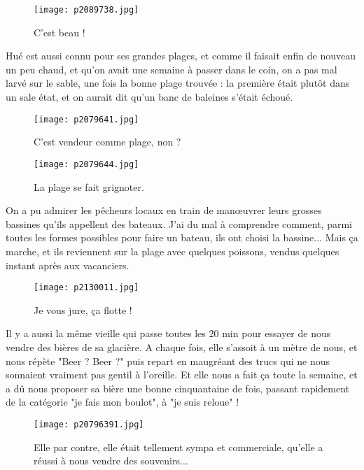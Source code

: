 \documentclass{book}
\begin{document}
\begin{figure}[h]
\centering
\texttt{[image: p2089738.jpg]}
\caption*{C'est beau !}
\end{figure}

Hué est aussi connu pour ses grandes plages, et comme il faisait enfin de nouveau un peu chaud, et qu'on avait une semaine à passer dans le coin, on a pas mal larvé sur le sable, une fois la bonne plage trouvée : la première était plutôt dans un sale état, et on aurait dit qu'un banc de baleines s'était échoué.




\begin{figure}[h]
\centering
\texttt{[image: p2079641.jpg]}
\caption*{C'est vendeur comme plage, non ?}
\end{figure}


\begin{figure}[h]
\centering
\texttt{[image: p2079644.jpg]}
\caption*{La plage se fait grignoter.}
\end{figure}

On a pu admirer les pêcheurs locaux en train de manœuvrer leurs grosses bassines qu'ils appellent des bateaux. J'ai du mal à comprendre comment, parmi toutes les formes possibles pour faire un bateau, ils ont choisi la bassine... Mais ça marche, et ils reviennent sur la plage avec quelques poissons, vendus quelques instant après aux vacanciers.




\begin{figure}[h]
\centering
\texttt{[image: p2130011.jpg]}
\caption*{Je vous jure, ça flotte !}
\end{figure}

Il y a aussi la même vieille qui passe toutes les 20 min pour essayer de nous vendre des bières de sa glacière. A chaque fois, elle s'assoit à un mètre de nous, et nous répète "Beer ? Beer ?" puis repart en maugréant des trucs qui ne nous sonnaient vraiment pas gentil à l'oreille. Et elle nous a fait ça toute la semaine, et a dû nous proposer sa bière une bonne cinquantaine de fois, passant rapidement de la catégorie "je fais mon boulot", à "je suis reloue" !


\begin{figure}[h]
\centering
\texttt{[image: p20796391.jpg]}
\caption*{Elle par contre, elle était tellement sympa et commerciale, qu'elle a réussi à nous vendre des souvenirs...}
\end{figure}
\end{document}
